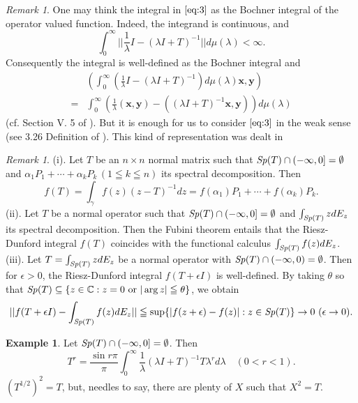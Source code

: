 \documentclass[reqno]{amsart}
\theoremstyle{definition}
\newtheorem{example}[theorem]{Example}
\theoremstyle{remark}
\newtheorem{remark}[theorem]{Remark}
\begin{document}
\begin{remark}\label{Re:2-1}\rm
One may think the integral in $\eqref{eq:3}$ as the Bochner integral of the operator valued 
function. Indeed, the integrand is continuous, and 
$$\int_0^{\infty} ||\frac{1}{\lambda} I - (\lambda I  + T)^{-1}|| d\mu(\lambda)
<\infty.$$
Consequently the integral is well-defined as the Bochner integral and 
\begin{align*}
&\left(\int_0^{\infty} (\frac{1}{\lambda} I - (\lambda I  + T)^{-1}) d\mu(\lambda)
\mathbf{x}, \mathbf{y}\right)\\
 =& \int_0^{\infty} \left(\frac{1}{\lambda}(\mathbf{x}, \mathbf{y}) - 
((\lambda I  + T)^{-1}\mathbf{x}, \mathbf{y})\right)  d\mu(\lambda)
\end{align*}
(cf. Section V. 5 of \cite{Y}). 
But it is enough for us to consider $\eqref{eq:3}$ in the weak sense (see 3.26 Definition of \cite{Rudin}). 
This kind of representation was dealt in \cite{Sano}
\end{remark}
\begin{remark}\label{Re:2-2}\rm
(i). Let $T$ be an $n\times n$ normal matrix such that ${\it Sp}(T) \cap (-\infty, 0] = \emptyset$ and $\alpha_1 P_1 + \cdots + \alpha_k P_k  
\, (1\leqq k \leqq n)$ its spectral decomposition. Then  
$$f(T)= \int_{\gamma} f(z) (z-T)^{-1} dz =  f(\alpha_1) P_1 + \cdots + 
f(\alpha_k) P_k.$$
(ii). Let $T$ be a normal operator such that ${\it Sp}(T) \cap (-\infty, 0] = \emptyset$ and 
$\int_{{\it Sp}(T)} z d E_z$ its spectral decomposition. Then the Fubini 
theorem entails that the Riesz-Dunford integral $f(T)$ coincides with the functional calculus 
$\int_{{\it Sp}(T)} f(z) d E_z$.\\
(iii). 
Let $T= \int_{{\it Sp}(T)} z dE_z$ be a normal operator with ${\it Sp}(T) \cap (-\infty, 0) = \emptyset$. Then for $\epsilon>0$, the Riesz-Dunford integral $f(T+ \epsilon I)$ is well-defined. 
By taking $\theta$ so that  
${\it Sp}(T) \subseteq \{ z \in \mathbb{C}: z=0\,\, \text{or}\,\, |\arg z| \leqq \theta \}$, we obtain 
$$||f(T+ \epsilon I) - \int_{{\it Sp}(T)} f(z) dE_z|| \leqq 
 \sup \{|f(z+ \epsilon) - f(z)|: z \in {\it Sp}(T)\} \to 0 \,\, (\epsilon \to 0).$$
\end{remark}

\begin{example}\label{Ex:2-1}
Let ${\it Sp}(T) \cap (-\infty, 0] = \emptyset$. Then 
\begin{equation}
T^r= \frac{\sin r \pi}{\pi} \int_0^{\infty} 
 \frac{1}{\lambda} (\lambda I + T)^{-1}T\lambda ^r d\lambda \quad (0<r<1). \label{eq:4}
\end{equation}
$(T^{1/2})^2 = T$, but, needles to say, there are plenty of $X$ such that $X^2=T$. 
\end{example}
\end{document}
